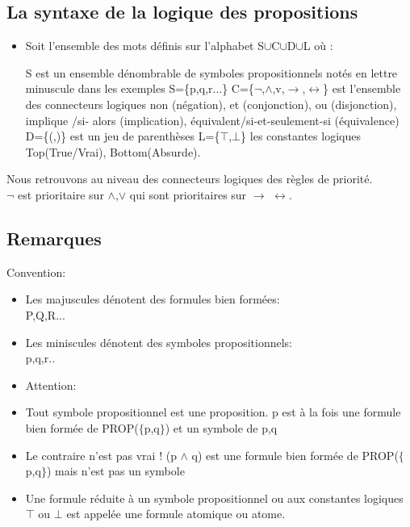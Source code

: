 \documentclass[a4paper,12pt]{article}
\begin{document}
\subsection{La syntaxe de la logique des propositions}
\begin{itemize}
\item Soit l'ensemble des mots définis sur l'alphabet S$\cup$C$\cup$D$\cup$L où : 

\subitem S est un ensemble dénombrable de symboles propositionnels notés en lettre minuscule dans les exemples S=\{p,q,r...\} 
\subitem C=\{$\neg$,$\wedge$,v,$\rightarrow$,$\leftrightarrow$\} est l'ensemble des connecteurs logiques non (négation),   et (conjonction),   ou (disjonction),   implique /si-
alors (implication),  équivalent/si-et-seulement-si  (équivalence)
\subitem D=\{(,)\} est un jeu de parenthèses
\subitem  L=\{$\top$,$\bot$\} les constantes logiques  Top(True/Vrai), Bottom(Absurde).
\end{itemize}
Nous retrouvons au niveau des connecteurs logiques des règles de priorité.\\
$\neg$ est prioritaire sur  $\wedge$,$\vee$ qui sont prioritaires sur $\rightarrow$ $\leftrightarrow$. 
\subsection{Remarques}

  Convention:
  \begin{itemize}
 \item Les majuscules dénotent des formules bien formées:\\
 P,Q,R...
 \item Les miniscules dénotent des symboles propositionnels:\\
 p,q,r..
 \item Attention:
 \item Tout symbole propositionnel est une proposition.
 p est à la fois une formule bien formée de PROP($\{$p,q$\}$) et un symbole de {p,q}
 \item Le contraire n'est pas vrai ! 
 (p $\wedge$ q) est une formule bien formée de PROP($\{$p,q$\}$) mais n'est pas un symbole\\
 \item Une formule réduite à un symbole propositionnel ou aux constantes logiques $\top$ ou $\bot$
 est appelée une formule atomique ou atome.
 \end{itemize}
\end{document}
